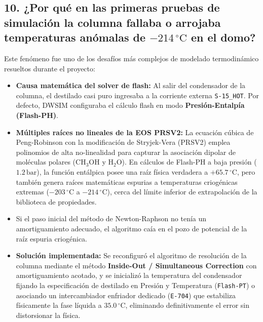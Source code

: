 \documentclass[11pt,a4paper]{article}
\begin{document}
\subsection{10. ¿Por qué en las primeras pruebas de simulación la columna fallaba o arrojaba temperaturas anómalas de \texorpdfstring{$-214\,^\circ\text{C}$}{-214 °C} en el domo?}
Este fenómeno fue uno de los desafíos más complejos de modelado termodinámico resueltos durante el proyecto:
\begin{itemize}
    \item \textbf{Causa matemática del solver de flash:} Al salir del condensador de la columna, el destilado casi puro ingresaba a la corriente externa \texttt{S-15\_HOT}. Por defecto, DWSIM configuraba el cálculo flash en modo \textbf{Presión-Entalpía (Flash-PH)}.
    \item \textbf{Múltiples raíces no lineales de la EOS PRSV2:} La ecuación cúbica de Peng-Robinson con la modificación de Stryjek-Vera (PRSV2) emplea polinomios de alta no-linealidad para capturar la asociación dipolar de moléculas polares ($\text{CH}_3\text{OH}$ y $\text{H}_2\text{O}$). En cálculos de Flash-PH a baja presión ($1.2\,\text{bar}$), la función entálpica posee una raíz física verdadera a $+65.7\,^\circ\text{C}$, pero también genera raíces matemáticas espurias a temperaturas criogénicas extremas ($-203\,^\circ\text{C}$ a $-214\,^\circ\text{C}$), cerca del límite inferior de extrapolación de la biblioteca de propiedades.
    \item Si el paso inicial del método de Newton-Raphson no tenía un amortiguamiento adecuado, el algoritmo caía en el pozo de potencial de la raíz espuria criogénica.
    \item \textbf{Solución implementada:} Se reconfiguró el algoritmo de resolución de la columna mediante el método \textbf{Inside-Out / Simultaneous Correction} con amortiguamiento acotado, y se inicializó la temperatura del condensador fijando la especificación de destilado en Presión y Temperatura (\texttt{Flash-PT}) o asociando un intercambiador enfriador dedicado (\texttt{E-704}) que estabiliza físicamente la fase líquida a $35.0\,^\circ\text{C}$, eliminando definitivamente el error sin distorsionar la física.
\end{itemize}
\end{document}
